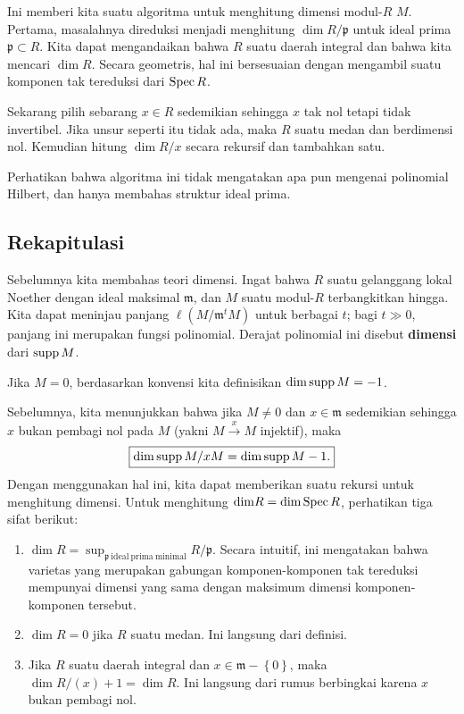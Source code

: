 Ini memberi kita suatu algoritma untuk menghitung dimensi modul-$R$ $M$. 
Pertama, masalahnya direduksi menjadi menghitung $\dim R/\mathfrak{p}$ untuk ideal prima $\mathfrak{p} \subset
R$. Kita dapat mengandaikan bahwa $R$ suatu daerah integral dan bahwa kita mencari
$\dim R$. Secara geometris, hal ini
bersesuaian dengan mengambil suatu komponen tak tereduksi dari $\operatorname{Spec} R$.

Sekarang pilih sebarang $x
\in R$ sedemikian sehingga $x$ tak nol tetapi tidak invertibel. Jika unsur seperti itu tidak ada,
maka $R$ suatu medan dan berdimensi nol. Kemudian hitung $\dim R/x$
secara rekursif dan tambahkan satu.

Perhatikan bahwa algoritma ini tidak mengatakan apa pun mengenai polinomial Hilbert, dan hanya
membahas struktur ideal prima.

\subsection{Rekapitulasi}
Sebelumnya kita membahas teori dimensi. 
Ingat bahwa $R$ suatu gelanggang lokal Noether dengan ideal maksimal $\mathfrak{m}$,
dan $M$ suatu modul-$R$ terbangkitkan hingga. Kita dapat meninjau panjang $\ell(M/\mathfrak{m}^t M)$
untuk berbagai $t$; bagi $t \gg 0$, panjang ini merupakan fungsi polinomial. Derajat
polinomial ini disebut \textbf{dimensi} dari $\operatorname{supp} M$. 

\begin{remark} 
Jika $M = 0$, berdasarkan konvensi kita definisikan $\mathrm{dim} \operatorname{supp} M = -1$.
\end{remark} 

Sebelumnya, kita menunjukkan bahwa jika $M \neq 0$ dan $x \in \mathfrak{m}$ sedemikian sehingga $x$
bukan pembagi nol pada $M$ (yakni $M \stackrel{x}{\to} M$ injektif), maka 
\[ \boxed{ \mathrm{dim} \operatorname{supp} M/xM = \mathrm{dim} \operatorname{supp} M - 1.}\]
Dengan menggunakan hal ini, kita dapat memberikan suatu rekursi untuk menghitung dimensi. 
Untuk menghitung $\mathrm{dim} R = \mathrm{dim} \operatorname{Spec} R$, perhatikan tiga sifat berikut:
\begin{enumerate}
\item $\dim R = \sup_{\mathfrak{p} \ \mathrm{ideal \ prima \ minimal}}
R/\mathfrak{p}$. Secara intuitif, ini mengatakan bahwa varietas yang merupakan gabungan
komponen-komponen tak tereduksi mempunyai dimensi yang sama dengan maksimum dimensi komponen-komponen tersebut.
\item $\dim R = 0$ jika $R$ suatu medan. Ini langsung dari definisi.
\item Jika $R$ suatu daerah integral dan $x \in \mathfrak{m} - \left\{0\right\}$, maka
$\dim R/(x) +1 = \dim R $. Ini langsung dari rumus berbingkai karena $x$ bukan pembagi nol.
\end{enumerate}

